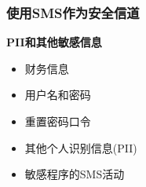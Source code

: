 \documentclass[10pt,aspectratio=43,mathserif]{beamer}
\begin{document}
		\begin{frame}
		  \frametitle{\textbf{使用SMS作为安全信道}}
		  \begin{block}{\textbf{PII和其他敏感信息}}
                \begin{itemize}
                    \item 财务信息
                    \item 用户名和密码
                    \item 重置密码口令
                    \item 其他个人识别信息(PII)
                    \item 敏感程序的SMS活动
                \end{itemize}
            \end{block}
		\end{frame}
\end{document}
